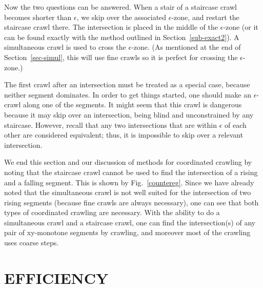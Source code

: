 Now the two questions can be answered.
When a stair of a staircase crawl becomes shorter than $\epsilon$, we 
skip over the associated $\epsilon$-zone, and restart the staircase crawl there.
The intersection is placed in the middle of the $\epsilon$-zone (or it can be found exactly
with the method outlined in Section~\ref{sub-exact2}).
A simultaneous crawl is used to cross the $\epsilon$-zone.
(As mentioned at the end of Section~\ref{sec-simul}, this will use fine crawls so 
	it is perfect for crossing the $\epsilon$-zone.)

The first crawl after an intersection must be treated as a special case, because neither 
segment dominates.
In order to get things started, one should make an $\epsilon$-crawl along one of the segments.
It might seem that this crawl is dangerous because it may skip over an intersection,
being blind and unconstrained by any staircase.
However, recall that any two intersections that are within $\epsilon$ of each other
are considered equivalent;  thus, it is impossible to skip over a relevant intersection.

We end this section and our discussion of methods for coordinated crawling by noting
that the staircase crawl cannot be used to find the intersection of a rising and a 
falling segment.
This is shown by Fig.~\ref{countereg}.
Since we have already noted that the simultaneous crawl is not well suited for the intersection
of two rising segments (because fine crawls are always necessary),
one can see that both types of coordinated crawling are necessary.
With the ability to do a simultaneous crawl and a staircase crawl, one can find the intersection(s)
of any pair of xy-monotone segments by crawling, and moreover most of the crawling uses coarse 
steps.


\section{EFFICIENCY}


